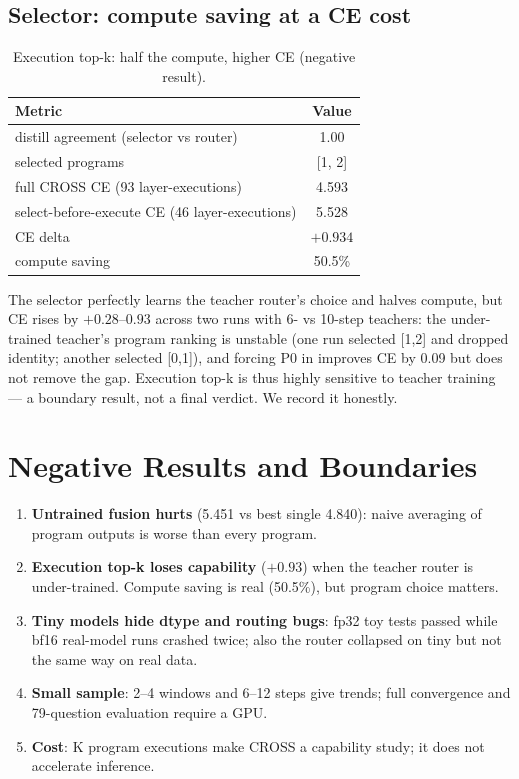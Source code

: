 \documentclass[11pt,a4paper]{article}
\begin{document}
\subsection{Selector: compute saving at a CE cost}
\begin{table}[h]
\centering
\begin{tabular}{lc}
\toprule
Metric & Value \\ \midrule
distill agreement (selector vs router) & 1.00 \\
selected programs & [1, 2] \\
full CROSS CE (93 layer-executions) & 4.593 \\
select-before-execute CE (46 layer-executions) & 5.528 \\
CE delta & $+0.934$ \\
compute saving & 50.5\% \\
\bottomrule
\end{tabular}
\caption{Execution top-k: half the compute, higher CE (negative result).}
\end{table}
The selector perfectly learns the teacher router's choice and halves compute, but
CE rises by $+0.28$--$0.93$ across two runs with 6- vs 10-step teachers: the
under-trained teacher's program ranking is unstable (one run selected [1,2] and
dropped identity; another selected [0,1]), and forcing P0 in improves CE by 0.09
but does not remove the gap. Execution top-k is thus highly sensitive to teacher
training --- a boundary result, not a final verdict. We record it honestly.

\section{Negative Results and Boundaries}
\begin{enumerate}[leftmargin=*]
  \item \textbf{Untrained fusion hurts} (5.451 vs best single 4.840): naive averaging
        of program outputs is worse than every program.
  \item \textbf{Execution top-k loses capability} ($+0.93$) when the teacher router
        is under-trained. Compute saving is real (50.5\%), but program choice matters.
  \item \textbf{Tiny models hide dtype and routing bugs}: fp32 toy tests passed while
        bf16 real-model runs crashed twice; also the router collapsed on tiny but
        not the same way on real data.
  \item \textbf{Small sample}: 2--4 windows and 6--12 steps give trends; full
        convergence and 79-question evaluation require a GPU.
  \item \textbf{Cost}: K program executions make CROSS a capability study; it does
        not accelerate inference.
\end{enumerate}
\end{document}
